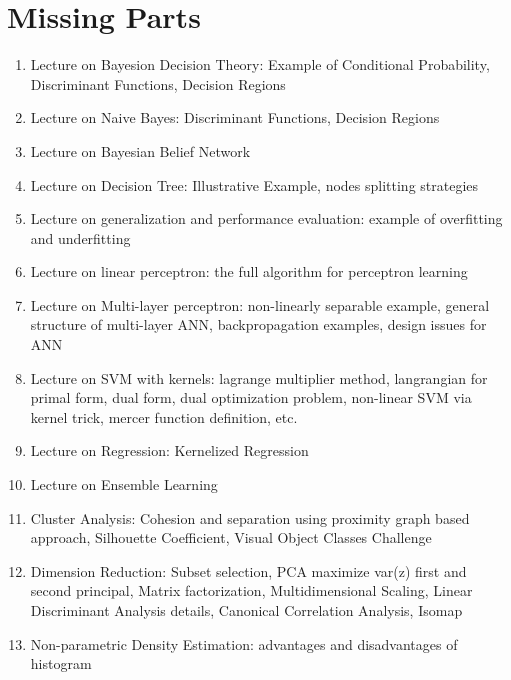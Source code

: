 \chapter{Missing Parts}

\begin{enumerate}
    \item Lecture on Bayesion Decision Theory: Example of Conditional Probability, Discriminant Functions, Decision Regions
    \item Lecture on Naive Bayes: Discriminant Functions, Decision Regions
    \item Lecture on Bayesian Belief Network
    \item Lecture on Decision Tree: Illustrative Example, nodes splitting strategies
    \item Lecture on generalization and performance evaluation: example of overfitting and underfitting 
    \item Lecture on linear perceptron: the full algorithm for perceptron learning
    \item Lecture on Multi-layer perceptron: non-linearly separable example, general structure of multi-layer ANN, backpropagation examples, design issues for ANN
    \item Lecture on SVM with kernels: lagrange multiplier method, langrangian for primal form, dual form, dual optimization problem, non-linear SVM via kernel trick, mercer function definition, etc.
    \item Lecture on Regression: Kernelized Regression
    \item Lecture on Ensemble Learning
    \item Cluster Analysis: Cohesion and separation using proximity graph based approach, Silhouette Coefficient, Visual Object Classes Challenge
    \item Dimension Reduction: Subset selection, PCA maximize var(z) first and second principal, Matrix factorization, Multidimensional Scaling, Linear Discriminant Analysis details, Canonical Correlation Analysis, Isomap
    \item Non-parametric Density Estimation: advantages and disadvantages of histogram
\end{enumerate}
